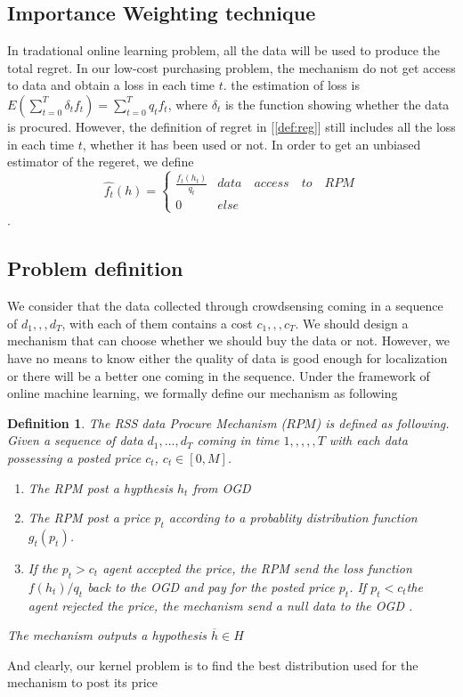 \documentclass[10pt,conference,compsocconf,letterpaper]{IEEEtran}
\newtheorem{definition}{Definition}
\begin{document}
\subsection{Importance Weighting technique}

In tradational online learning problem, all the data will be used to produce the total regret. In our low-cost purchasing problem, the mechanism do not get access to data and obtain a loss in each time $t$.  the estimation of loss is $E(\sum_{t=0}^T\delta_t f_t)=\sum_{t=0}^T q_t f_t$, where $\delta_t$ is the function showing whether the data is procured. However, the definition of regret in [\ref{def:reg}] still includes all the loss in each time $t$, whether it has been used or not.  In order to get an unbiased estimator of the regeret, we define
\begin{equation}
\hat{f_t}(h)=\begin{cases}{}
  \frac{f_t(h_t)}{q_t} & data\quad access\quad to\quad RPM  \\
  0 & else 
\end{cases}
\end{equation}
.


\subsection{Problem definition}
We consider that the data collected through crowdsensing coming in a sequence of $d_1,,,d_T$, with each of them contains a cost $c_1,,,c_T$. We should design a mechanism that can choose whether we should buy the data or not. However, we have no means to know either the quality of data is good enough for localization or there will be a better one coming in the sequence. Under the framework of online machine learning, we formally define our mechanism as following
\begin{definition}{}\label{def:1}
The RSS data Procure Mechanism ($RPM$) is defined as following. Given a sequence of data ${d_1,...,d_T}$ coming in time $1,,,,,T$ with each data possessing a posted price $c_t$, $c_t\in [0,M]$. 
\begin{enumerate}
\item The RPM post a hypthesis $h_t$ from OGD
\item The RPM post a price $p_t$ according to a probablity distribution function $g_t(p_t)$.
\item If the $p_t>c_t$ agent accepted the price, the RPM send the loss function $f(h_t)/q_t$ back to the OGD and pay for the posted price $p_t$. If $p_t<c_t$the agent rejected the price, the mechanism send a null data to the OGD . 
\end{enumerate}
The mechanism outputs a hypothesis $\overline{h}\in H$
\end{definition}
And clearly, our kernel problem is to find the best distribution used for the mechanism to post its price 
\end{document}
